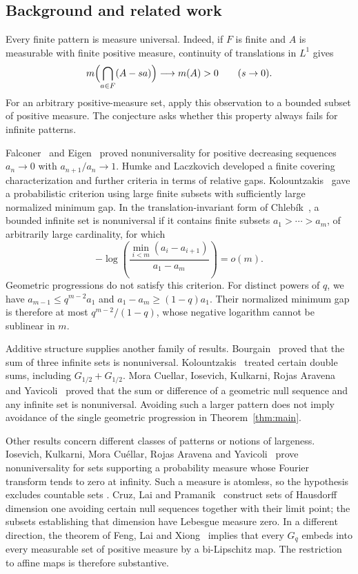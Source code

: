 \subsection{Background and related work}

Every finite pattern is measure universal. Indeed, if $F$ is finite
and $A$ is measurable with finite positive measure, continuity of
translations in $L^1$ gives
\[
 m\Bigl(\bigcap_{a\in F}(A-sa)\Bigr)\longrightarrow m(A)>0
 \qquad(s\to0).
\]
For an arbitrary positive-measure set, apply this observation to a
bounded subset of positive measure. The conjecture asks whether this
property always fails for infinite patterns.

Falconer~\cite{Falconer1984} and Eigen~\cite{Eigen1985} proved
nonuniversality for positive decreasing sequences $a_n\to0$ with
$a_{n+1}/a_n\to1$. Humke and Laczkovich
\cite[Theorems~1--2 and Corollary~1]{HumkeLaczkovich1998} developed a
finite covering characterization and further criteria in terms of
relative gaps. Kolountzakis~\cite[Theorem~3]{Kolountzakis1997} gave
a probabilistic criterion using large finite subsets with sufficiently
large normalized minimum gap. In the translation-invariant form of
Chleb\'ik~\cite[Theorem~15]{Chlebik2015}, a bounded infinite set is
nonuniversal if it contains finite subsets $a_1>\cdots>a_m$, of
arbitrarily large cardinality, for which
\[
 -\log\left(\frac{\min_{i<m}(a_i-a_{i+1})}{a_1-a_m}\right)=o(m).
\]
Geometric progressions do not satisfy this criterion. For distinct
powers of $q$, we have $a_{m-1}\le q^{m-2}a_1$ and
$a_1-a_m\ge(1-q)a_1$. Their normalized minimum gap is therefore at
most $q^{m-2}/(1-q)$, whose negative logarithm cannot be sublinear
in $m$.

Additive structure supplies another family of results.
Bourgain~\cite{Bourgain1987} proved that the sum of three infinite
sets is nonuniversal. Kolountzakis~\cite{Kolountzakis1997} treated
certain double sums, including $G_{1/2}+G_{1/2}$.
Mora Cuellar, Iosevich, Kulkarni, Rojas Aravena and
Yavicoli~\cite[Theorem~2]{MoraCuellarEtAl2026Twofold} proved that the
sum or difference of a geometric null sequence and any infinite set
is nonuniversal. Avoiding such a larger pattern does not imply
avoidance of the single geometric progression in Theorem~\ref{thm:main}.

Other results concern different classes of patterns or notions of
largeness. Iosevich, Kulkarni, Mora Cu\'ellar, Rojas Aravena and
Yavicoli~\cite[Theorem~1.5]{IKMRY2026Rajchman} prove nonuniversality
for sets supporting a probability measure whose Fourier transform
tends to zero at infinity. Such a measure is atomless, so the
hypothesis excludes countable sets
\cite[Proposition~4.1]{IKMRY2026Rajchman}.
Cruz, Lai and Pramanik~\cite[preprint, Corollary~1.2 and
Proposition~4.4]{CruzLaiPramanik2023} construct sets of Hausdorff
dimension one avoiding certain null sequences together with their
limit point; the subsets establishing that dimension have Lebesgue
measure zero. In a different direction, the theorem of Feng, Lai and
Xiong~\cite[preprint, Theorem~1.1]{FengLaiXiong2024} implies that
every $G_q$ embeds into every measurable set of positive measure by
a bi-Lipschitz map. The restriction to affine maps is therefore
substantive.

